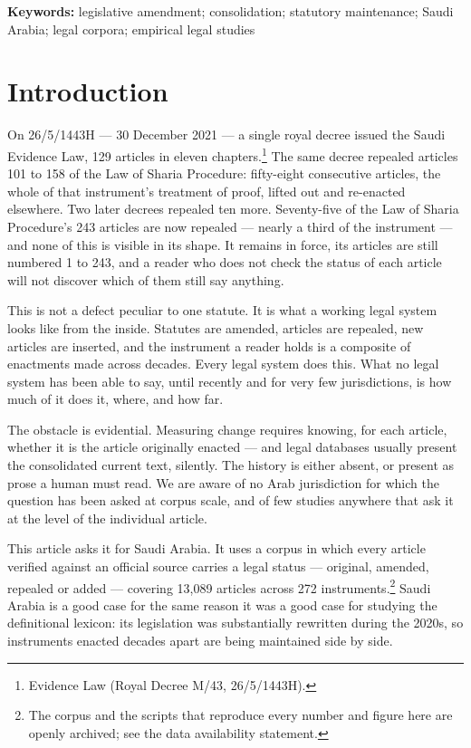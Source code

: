 \documentclass[11pt]{article}
\begin{document}
\vspace{1em}\noindent\textbf{Keywords:} legislative amendment; consolidation;
statutory maintenance; Saudi Arabia; legal corpora; empirical legal studies
\vspace{1.5em}

\section{Introduction}

On 26/5/1443H --- 30 December 2021 --- a single royal decree issued the Saudi
Evidence Law, 129 articles in eleven chapters.\footnote{Evidence Law (Royal
Decree M/43, 26/5/1443H).} The same decree repealed articles 101 to 158 of the
Law of Sharia Procedure: fifty-eight consecutive articles, the whole of that
instrument's treatment of proof, lifted out and re-enacted elsewhere. Two
later decrees repealed ten more. Seventy-five of the Law of Sharia Procedure's
243 articles are now repealed --- nearly a third of the instrument --- and
none of this is visible in its shape. It remains in force, its articles are
still numbered 1 to 243, and a reader who does not check the status of each
article will not discover which of them still say anything.

This is not a defect peculiar to one statute. It is what a working legal
system looks like from the inside. Statutes are amended, articles are
repealed, new articles are inserted, and the instrument a reader holds is a
composite of enactments made across decades. Every legal system does this.
What no legal system has been able to say, until recently and for very few
jurisdictions, is how much of it does it, where, and how far.

The obstacle is evidential. Measuring change requires knowing, for each
article, whether it is the article originally enacted --- and legal databases
usually present the consolidated current text, silently. The history is
either absent, or present as prose a human must read. We are aware of no Arab
jurisdiction for which the question has been asked at corpus scale, and of few
studies anywhere that ask it at the level of the individual article.

This article asks it for Saudi Arabia. It uses a corpus in which every article
verified against an official source carries a legal status --- original,
amended, repealed or added --- covering 13,089 articles across 272
instruments.\footnote{The corpus and the scripts that reproduce every number
and figure here are openly archived; see the data availability statement.}
Saudi Arabia is a good case for the same reason it was a good case for
studying the definitional lexicon: its legislation was substantially rewritten
during the 2020s, so instruments enacted decades apart are being maintained
side by side.
\end{document}
